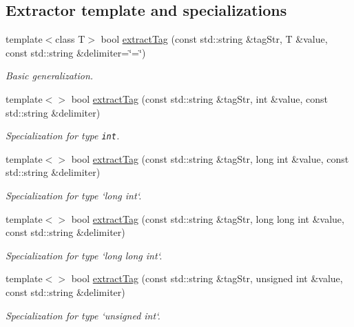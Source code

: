 \subsection*{Extractor template and specializations}
\begin{CompactItemize}
\item 
template$<$class T$>$ bool \hyperlink{namespaceConfiguration_1d121b798bbbd17f070deb2cbe29076f}{extract\-Tag} (const std::string \&tag\-Str, T \&value, const std::string \&delimiter=\char`\"{}=\char`\"{})
\begin{CompactList}\small\item\em Basic generalization. \item\end{CompactList}\item 
template$<$$>$ bool \hyperlink{namespaceConfiguration_76bd2eb20a53277e56bb0149ef306281}{extract\-Tag} (const std::string \&tag\-Str, int \&value, const std::string \&delimiter)
\begin{CompactList}\small\item\em Specialization for type {\tt int}. \item\end{CompactList}\item 
template$<$$>$ bool \hyperlink{namespaceConfiguration_98cb275ddb4af5ad9a8436ea7436d370}{extract\-Tag} (const std::string \&tag\-Str, long int \&value, const std::string \&delimiter)
\begin{CompactList}\small\item\em Specialization for type `long int`. \item\end{CompactList}\item 
template$<$$>$ bool \hyperlink{namespaceConfiguration_e1178315ef9eec7f06ba80c1ef2acb5f}{extract\-Tag} (const std::string \&tag\-Str, long long int \&value, const std::string \&delimiter)
\begin{CompactList}\small\item\em Specialization for type `long long int`. \item\end{CompactList}\item 
template$<$$>$ bool \hyperlink{namespaceConfiguration_2ccfdb18a3633ba97cd30f7d5ff1b198}{extract\-Tag} (const std::string \&tag\-Str, unsigned int \&value, const std::string \&delimiter)
\begin{CompactList}\small\item\em Specialization for type `unsigned int`. \item\end{CompactList}\item 

\end{CompactItemize}
